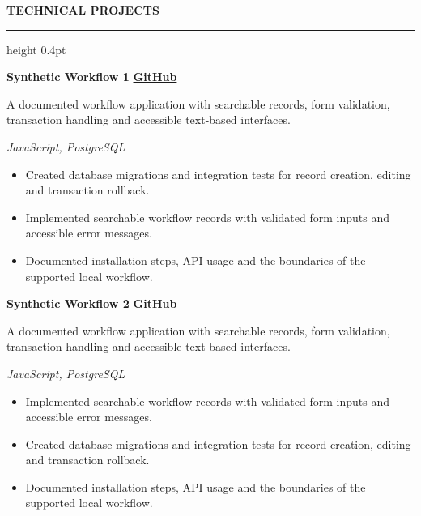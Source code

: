 \documentclass[10pt,letterpaper]{article}
\newcommand{\atsSectionToSection}{6.1pt}
\newcommand{\atsHeadingToContent}{2pt}
\newcommand{\atsEntryToEntry}{3.4pt}
\newcommand{\atsProjectTitleToTech}{1pt}
\newcommand{\atsProjectTechToBullets}{1.5pt}
\newcommand{\atsBulletToBullet}{0.6pt}
\newcommand{\atssection}[1]{%
  \vspace{\atsSectionToSection}%
  {\noindent\large\bfseries\uppercase{#1}}\par
  \vspace{1.5pt}\hrule height 0.4pt\vspace{\atsHeadingToContent}%
}
\begin{document}
\atssection{Technical Projects}
\textbf{Synthetic Workflow 1} \hfill {\small \href{https://github.com/synthetic-fixture/project-3}{\textbf{GitHub}}}\par
A documented workflow application with searchable records, form validation, transaction handling and accessible text-based interfaces.\par
\vspace{\atsProjectTitleToTech}
{\textit{JavaScript, PostgreSQL}}\par
\vspace{\atsProjectTechToBullets}
\begin{itemize}
\setlength{\itemsep}{\atsBulletToBullet}\setlength{\parskip}{0pt}\setlength{\parsep}{0pt}\setlength{\topsep}{0pt}\setlength{\partopsep}{0pt}
  \item Created database migrations and integration tests for record creation, editing and transaction rollback.
  \item Implemented searchable workflow records with validated form inputs and accessible error messages.
  \item Documented installation steps, API usage and the boundaries of the supported local workflow.
\end{itemize}
\vspace{\atsEntryToEntry}
\textbf{Synthetic Workflow 2} \hfill {\small \href{https://github.com/synthetic-fixture/project-4}{\textbf{GitHub}}}\par
A documented workflow application with searchable records, form validation, transaction handling and accessible text-based interfaces.\par
\vspace{\atsProjectTitleToTech}
{\textit{JavaScript, PostgreSQL}}\par
\vspace{\atsProjectTechToBullets}
\begin{itemize}
\setlength{\itemsep}{\atsBulletToBullet}\setlength{\parskip}{0pt}\setlength{\parsep}{0pt}\setlength{\topsep}{0pt}\setlength{\partopsep}{0pt}
  \item Implemented searchable workflow records with validated form inputs and accessible error messages.
  \item Created database migrations and integration tests for record creation, editing and transaction rollback.
  \item Documented installation steps, API usage and the boundaries of the supported local workflow.
\end{itemize}
\end{document}
